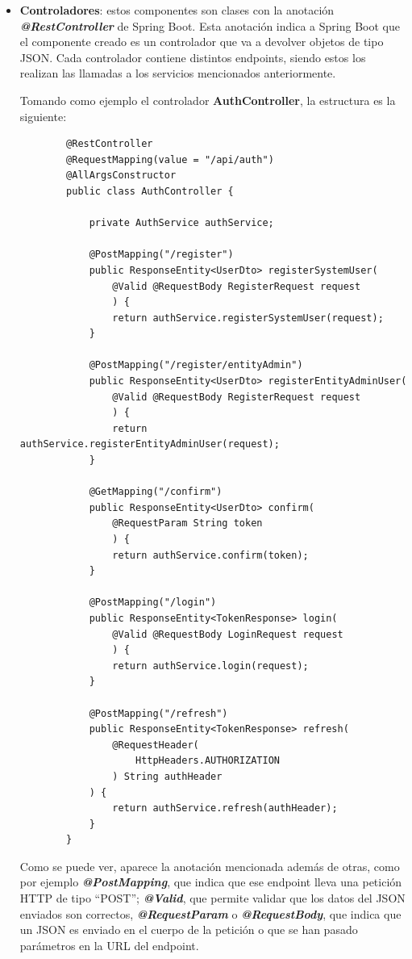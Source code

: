 \begin{itemize}
    \item \textbf{Controladores}: estos componentes son clases con la anotación \textbf{\textit{@RestController}} de Spring Boot. Esta
    anotación indica a Spring Boot que el componente creado es un controlador que va a devolver objetos de tipo JSON. Cada controlador
    contiene distintos endpoints, siendo estos los realizan las llamadas a los servicios mencionados anteriormente. 
    
    Tomando como ejemplo el controlador \textbf{AuthController}, la estructura es la siguiente:

    \begin{verbatim}
        @RestController
        @RequestMapping(value = "/api/auth")
        @AllArgsConstructor
        public class AuthController {

            private AuthService authService;

            @PostMapping("/register")
            public ResponseEntity<UserDto> registerSystemUser(
                @Valid @RequestBody RegisterRequest request
                ) {
                return authService.registerSystemUser(request);
            }

            @PostMapping("/register/entityAdmin")
            public ResponseEntity<UserDto> registerEntityAdminUser(
                @Valid @RequestBody RegisterRequest request
                ) {
                return authService.registerEntityAdminUser(request);
            }
            
            @GetMapping("/confirm")
            public ResponseEntity<UserDto> confirm(
                @RequestParam String token
                ) {
                return authService.confirm(token);
            }

            @PostMapping("/login")
            public ResponseEntity<TokenResponse> login(
                @Valid @RequestBody LoginRequest request
                ) {
                return authService.login(request);
            }
            
            @PostMapping("/refresh")
            public ResponseEntity<TokenResponse> refresh(
                @RequestHeader(
                    HttpHeaders.AUTHORIZATION
                ) String authHeader
            ) {
                return authService.refresh(authHeader);
            }
        }
    \end{verbatim}

    Como se puede ver, aparece la anotación mencionada además de otras, como por ejemplo \textbf{\textit{@PostMapping}}, que 
    indica que ese endpoint lleva una petición HTTP de tipo ``POST''; \textbf{\textit{@Valid}}, que permite validar que los datos
    del JSON enviados son correctos, \textbf{\textit{@RequestParam}} o \textbf{\textit{@RequestBody}}, que indica que un JSON es 
    enviado en el cuerpo de la petición o que se han pasado parámetros en la URL del endpoint.


\end{itemize}

